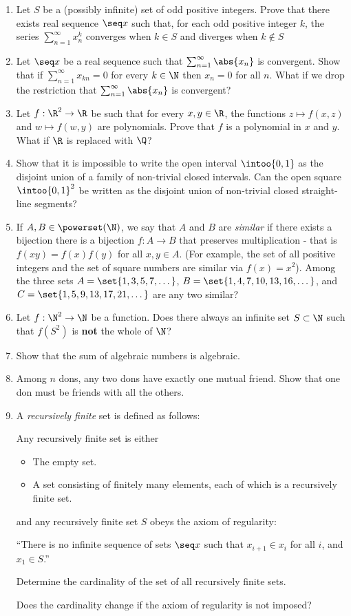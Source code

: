 \documentclass[12pt,a4paper]{article}
\begin{document}
\begin{enumerate}
 \item
  Let \(S\) be a (possibly infinite) set of odd positive integers. Prove that
  there exists real sequence \(\seq x\) such that, for each odd positive integer
  \(k\), the series \(\sum_{n = 1}^\infty x_n^k\) converges when \(k \in S\) and
  diverges when \(k \notin S\)
 \item
  Let \(\seq x\) be a real sequence such that \(\sum_{n = 1}^\infty \abs{x_n}\)
  is convergent. Show that if \(\sum_{n = 1}^\infty x_{kn} = 0\) for every
  \(k \in \N\) then \(x_n = 0\) for all \(n\). What if we drop the restriction
  that \(\sum_{n = 1}^\infty \abs{x_n}\) is convergent?
 \item
  Let \(f: \R^2 \to \R\) be such that for every \(x, y \in \R\), the functions
  \(z \mapsto f(x, z)\) and \(w \mapsto f(w, y)\) are polynomials. Prove that
  \(f\) is a polynomial in \(x\) and \(y\). What if \(\R\) is replaced with
  \(\Q\)?
 \item
  Show that it is impossible to write the open interval \(\intoo{0, 1}\) as the
  disjoint union of a family of non-trivial closed intervals. Can the open
  square \(\intoo{0, 1}^2\) be written as the disjoint union of non-trivial
  closed straight-line segments?
 \item
  If \(A, B \in \powerset(\N)\), we say that \(A\) and \(B\) are \emph{similar}
  if there exists a bijection there is a bijection \(f: A \to B\) that preserves
  multiplication - that is \(f(xy) = f(x)f(y)\) for all \(x, y \in A\). (For
  example, the set of all positive integers and the set of square numbers are
  similar via \(f(x) = x^2\)). Among the three sets
  \(A = \set{1, 3, 5, 7, \dotsc}\), \(B = \set{1, 4, 7, 10, 13, 16, \dotsc}\),
  and \(C = \set{1, 5, 9, 13, 17, 21, \dotsc}\) are any two similar?
 \item
  Let \(f : \N^2 \to \N\) be a function. Does there always an infinite set
  \(S \subset \N\) such that \(f(S^2)\) is \textbf{not} the whole of \(\N\)?
 \item
  Show that the sum of algebraic numbers is algebraic.
 \item
  Among \(n\) dons, any two dons have exactly one mutual friend. Show that one
  don must be friends with all the others.
 \item
  A \emph{recursively finite} set is defined as follows:

  Any recursively finite set is either
  \begin{itemize}
   \item
    The empty set.
   \item
    A set consisting of finitely many elements, each of which is a
    recursively finite set.
  \end{itemize}
  and any recursively finite set \(S\) obeys the axiom of regularity:

  ``There is no infinite sequence of sets \(\seq x\) such that
  \(x_{i + 1} \in x_i\) for all \(i\), and \(x_1 \in S\).''

  Determine the cardinality of the set of all recursively finite sets.

  Does the cardinality change if the axiom of regularity is not imposed?
\end{enumerate}
\end{document}
